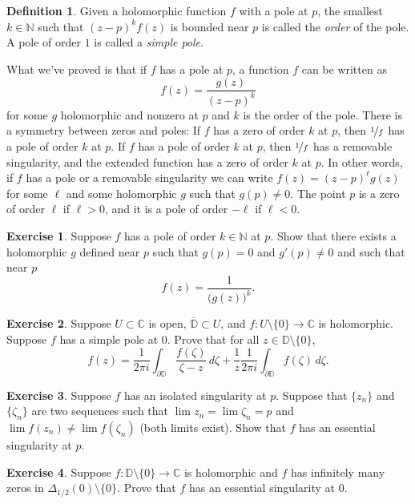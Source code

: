 \documentclass[12pt,openany]{book}
\newcommand{\C}{{\mathbb{C}}}
\newcommand{\N}{{\mathbb{N}}}
\newcommand{\D}{{\mathbb{D}}}
\newcommand{\myindex}[1]{#1\index{#1}}
\theoremstyle{plain}
\theoremstyle{remark}
\theoremstyle{definition}
\newtheorem{defn}[thm]{Definition}
\newenvironment{exbox}{%
    \def\FrameCommand{\vrule width 1pt \relax\hspace{10pt}}%
    \MakeFramed{\advance\hsize-\width\FrameRestore}%
}{%
    \endMakeFramed
}
\theoremstyle{exercise}
\newtheorem{exercise}{Exercise}[section]
\theoremstyle{example}
\begin{document}
\begin{defn}
Given a holomorphic function $f$ with a pole at $p$, the smallest $k \in \N$
such that ${(z-p)}^k f(z)$ is bounded near $p$ is called the
\emph{order} of the pole.
A pole of order $1$ is called a \emph{\myindex{simple pole}}.
\end{defn}

What we've proved is that if $f$
has a pole at $p$, a function $f$ can be written as
\begin{equation*}
f(z) = \frac{g(z)}{{(z-p)}^k}
\end{equation*}
for some $g$ holomorphic and nonzero at $p$ and $k$ is the order of the pole.
There is a symmetry between zeros and poles:
If $f$ has a zero of order $k$ at $p$, then $\nicefrac{1}{f}$ has a pole of
order $k$ at $p$.
If $f$ has a pole of order $k$ at $p$, then $\nicefrac{1}{f}$
has a removable singularity, and the extended function has a zero of order
$k$ at $p$.
In other words, if $f$ has a pole or a removable singularity we can write
$f(z) = {(z-p)}^\ell g(z)$ for some $\ell$ and some holomorphic $g$ such
that $g(p) \not= 0$.
The point $p$ is a zero of order $\ell$ if $\ell
> 0$, and it is a pole of order $-\ell$ if $\ell < 0$.

\begin{exbox}
\begin{exercise}
Suppose $f$ has a pole of order $k \in \N$ at $p$.
Show that there exists a holomorphic $g$ defined near $p$
such that $g(p) = 0$ and $g'(p) \not= 0$ and such that near $p$
\begin{equation*}
f(z) = \frac{1}{{\bigl(g(z)\bigr)}^k} .
\end{equation*}
\end{exercise}

\begin{exercise}
Suppose $U \subset \C$ is open, $\overline{\D} \subset U$,
and $f \colon U \setminus \{0\} \to \C$ is holomorphic.
Suppose $f$ has a simple pole at $0$.  Prove that for all
$z \in \D \setminus \{ 0 \}$,
\begin{equation*}
f(z) =
\frac{1}{2\pi i} \int_{\partial \D}
\frac{f(\zeta)}{\zeta-z} \, d\zeta
+
\frac{1}{z}
\frac{1}{2\pi i} \int_{\partial \D}
f(\zeta) \, d\zeta .
\end{equation*}
\end{exercise}

\begin{exercise}
Suppose $f$ has an isolated singularity at $p$.  Suppose that
$\{ z_n \}$ and $\{ \zeta_n \}$ are two sequences such that
$\lim z_n = \lim \zeta_n = p$ and $\lim f(z_n) \not= \lim f(\zeta_n)$
(both limits exist).
Show that $f$ has an essential singularity at $p$.
\end{exercise}

\begin{exercise}
Suppose $f \colon \D \setminus \{0\} \to \C$ is holomorphic and
$f$ has infinitely many zeros in $\Delta_{1/2}(0) \setminus \{ 0 \}$.
Prove that $f$ has an essential singularity at $0$.
\end{exercise}
\end{exbox}
\end{document}

